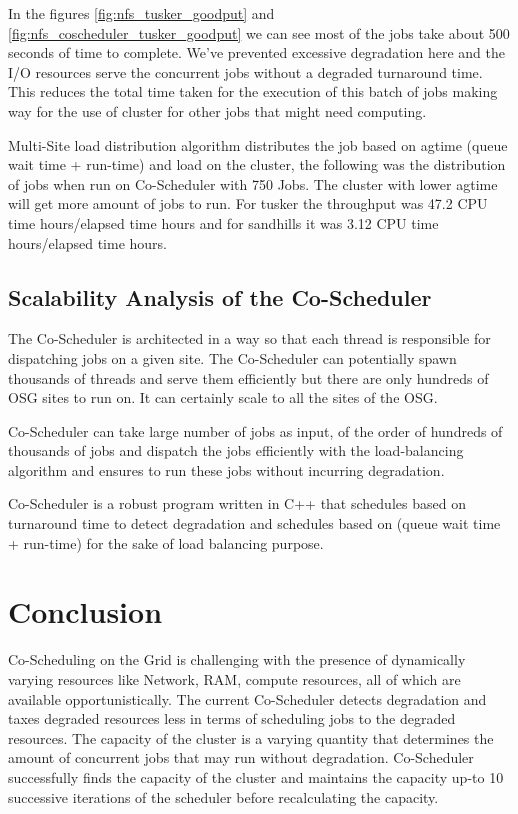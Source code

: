 \documentclass[ms,electronic,double]{nuthesis}
\begin{document}
In the figures \ref{fig:nfs_tusker_goodput} and \ref{fig:nfs_coscheduler_tusker_goodput} we can see most of the jobs take about 
500 seconds of time to complete. We've prevented excessive degradation here and 
the I/O resources serve the concurrent jobs without a degraded turnaround time. 
This reduces the total time taken for the execution of this batch of jobs 
making way for the use of cluster for other jobs that might need computing.

Multi-Site load distribution algorithm distributes the job based on agtime (queue wait time + run-time) and load on the cluster, the following was the distribution of jobs when run 
on Co-Scheduler with 750 Jobs. The cluster with lower agtime will get more amount of jobs to run. 
For tusker the throughput was 47.2 CPU time hours/elapsed time hours and for sandhills it was 3.12 CPU time hours/elapsed time hours.

\section{Scalability Analysis of the Co-Scheduler}

The Co-Scheduler is architected in a way so that each thread is responsible for 
dispatching jobs on a given site. The Co-Scheduler can potentially spawn thousands 
of threads and serve them efficiently but there are only hundreds of OSG sites 
to run on. It can certainly scale to all the sites of the OSG. 

Co-Scheduler can take large number of jobs as input, of the order of hundreds 
of thousands of jobs and dispatch the jobs efficiently with the load-balancing 
algorithm and ensures to run these jobs without incurring degradation.

Co-Scheduler is a robust program written in C++ that schedules based on 
turnaround time to detect degradation and schedules based on  (queue wait time + 
run-time) for the sake of load balancing purpose.

\chapter{Conclusion}

Co-Scheduling on the Grid is challenging with the presence of dynamically varying 
resources like Network, RAM, compute resources, all of which are available opportunistically. 
The current Co-Scheduler 
detects degradation and taxes degraded resources less in terms of scheduling 
jobs to the degraded resources. The capacity of the cluster is a varying 
quantity that determines the amount of concurrent jobs that may run without 
degradation. Co-Scheduler successfully finds the capacity of the cluster and 
maintains the capacity up-to 10 successive iterations of the scheduler before 
recalculating the capacity.
\end{document}
